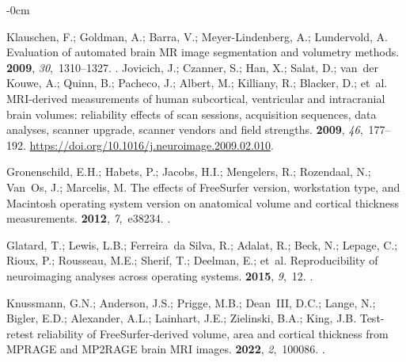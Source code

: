 \documentclass[diagnostics,article,accept,pdftex,moreauthors]{Definitions/mdpi}
\begin{document}
\begin{adjustwidth}{-\extralength}{0cm}
\begin{thebibliography}{999}
Klauschen, F.; Goldman, A.; Barra, V.; Meyer-Lindenberg, A.; Lundervold, A.
\newblock Evaluation of automated brain {MR} image segmentation and volumetry
  methods.
 {\bf 2009}, {\em 30},~1310--1327.
.
Jovicich, J.; Czanner, S.; Han, X.; Salat, D.; van~der Kouwe, A.; Quinn, B.;
  Pacheco, J.; Albert, M.; Killiany, R.; Blacker, D.;  et~al.
\newblock MRI-derived measurements of human subcortical, ventricular and
  intracranial brain volumes: reliability effects of scan sessions, acquisition
  sequences, data analyses, scanner upgrade, scanner vendors and field
  strengths.
 {\bf 2009}, {\em 46},~177--192.
\newblock
  {\url{https://doi.org/10.1016/j.neuroimage.2009.02.010}}.

Gronenschild, E.H.; Habets, P.; Jacobs, H.I.; Mengelers, R.; Rozendaal, N.;
  Van~Os, J.; Marcelis, M.
\newblock The effects of {FreeSurfer version, workstation type, and Macintosh}
  operating system version on anatomical volume and cortical thickness
  measurements.
 {\bf 2012}, {\em 7},~e38234.
.

Glatard, T.; Lewis, L.B.; Ferreira~da Silva, R.; Adalat, R.; Beck, N.; Lepage,
  C.; Rioux, P.; Rousseau, M.E.; Sherif, T.; Deelman, E.;  et~al.
\newblock Reproducibility of neuroimaging analyses across operating systems.
 {\bf 2015}, {\em 9},~12.
.

Knussmann, G.N.; Anderson, J.S.; Prigge, M.B.; Dean~III, D.C.; Lange, N.;
  Bigler, E.D.; Alexander, A.L.; Lainhart, J.E.; Zielinski, B.A.; King, J.B.
\newblock Test-retest reliability of FreeSurfer-derived volume, area and
  cortical thickness from MPRAGE and MP2RAGE brain MRI images.
 {\bf 2022}, {\em 2},~100086.
.


\end{thebibliography}
\end{adjustwidth}
\end{document}

